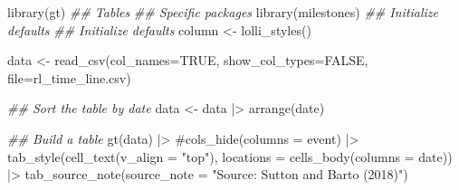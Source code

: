 \documentclass[
  letterpaper,
  DIV=11,
  numbers=noendperiod]{scrreprt}
\newenvironment{Shaded}{\begin{snugshade}}{\end{snugshade}}
\newcommand{\AttributeTok}[1]{\textcolor[rgb]{0.40,0.45,0.13}{#1}}
\newcommand{\CommentTok}[1]{\textcolor[rgb]{0.37,0.37,0.37}{#1}}
\newcommand{\ConstantTok}[1]{\textcolor[rgb]{0.56,0.35,0.01}{#1}}
\newcommand{\DocumentationTok}[1]{\textcolor[rgb]{0.37,0.37,0.37}{\textit{#1}}}
\newcommand{\FunctionTok}[1]{\textcolor[rgb]{0.28,0.35,0.67}{#1}}
\newcommand{\NormalTok}[1]{\textcolor[rgb]{0.00,0.23,0.31}{#1}}
\newcommand{\OtherTok}[1]{\textcolor[rgb]{0.00,0.23,0.31}{#1}}
\newcommand{\SpecialCharTok}[1]{\textcolor[rgb]{0.37,0.37,0.37}{#1}}
\newcommand{\StringTok}[1]{\textcolor[rgb]{0.13,0.47,0.30}{#1}}
\begin{document}
\begin{Shaded}
\begin{Highlighting}[]
\FunctionTok{library}\NormalTok{(gt)        }\DocumentationTok{\#\# Tables}
\DocumentationTok{\#\# Specific packages}
\FunctionTok{library}\NormalTok{(milestones)}
\DocumentationTok{\#\# Initialize defaults}
\DocumentationTok{\#\# Initialize defaults}
\NormalTok{column }\OtherTok{\textless{}{-}} \FunctionTok{lolli\_styles}\NormalTok{()}

\NormalTok{data }\OtherTok{\textless{}{-}} \FunctionTok{read\_csv}\NormalTok{(}\AttributeTok{col\_names=}\ConstantTok{TRUE}\NormalTok{, }\AttributeTok{show\_col\_types=}\ConstantTok{FALSE}\NormalTok{, }\AttributeTok{file=}\StringTok{\textquotesingle{}rl\_time\_line.csv\textquotesingle{}}\NormalTok{)}
\end{Highlighting}
\end{Shaded}

\begin{Shaded}
\begin{Highlighting}[]
\DocumentationTok{\#\# Sort the table by date}
\NormalTok{data }\OtherTok{\textless{}{-}}\NormalTok{ data }\SpecialCharTok{|\textgreater{}}
  \FunctionTok{arrange}\NormalTok{(date)}

\DocumentationTok{\#\# Build a table}
\FunctionTok{gt}\NormalTok{(data) }\SpecialCharTok{|\textgreater{}}
  \CommentTok{\#cols\_hide(columns = event) |\textgreater{}}
  \FunctionTok{tab\_style}\NormalTok{(}\FunctionTok{cell\_text}\NormalTok{(}\AttributeTok{v\_align =} \StringTok{"top"}\NormalTok{),}
            \AttributeTok{locations =} \FunctionTok{cells\_body}\NormalTok{(}\AttributeTok{columns =}\NormalTok{ date)) }\SpecialCharTok{|\textgreater{}}
  \FunctionTok{tab\_source\_note}\NormalTok{(}\AttributeTok{source\_note =} \StringTok{"Source: Sutton and Barto (2018)"}\NormalTok{) }
\end{Highlighting}
\end{Shaded}
\end{document}
